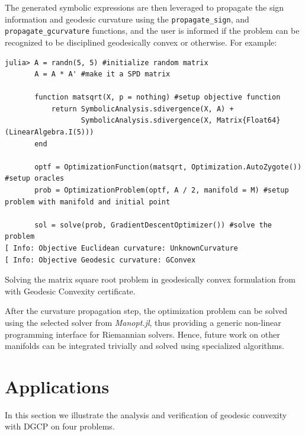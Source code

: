 \documentclass[twoside,11pt]{article}
\begin{document}
The generated symbolic expressions are then leveraged to propagate the sign information and geodesic curvature using the \texttt{propagate\_sign}, and \texttt{propagate\_gcurvature} functions, and the user is informed if the problem can be recognized to be disciplined geodesically convex or otherwise. For example:

\begin{listing}[hbt!]
\begin{verbatim}
julia> A = randn(5, 5) #initialize random matrix
       A = A * A' #make it a SPD matrix

       function matsqrt(X, p = nothing) #setup objective function
           return SymbolicAnalysis.sdivergence(X, A) +
                  SymbolicAnalysis.sdivergence(X, Matrix{Float64}(LinearAlgebra.I(5)))
       end

       optf = OptimizationFunction(matsqrt, Optimization.AutoZygote()) #setup oracles
       prob = OptimizationProblem(optf, A / 2, manifold = M) #setup problem with manifold and initial point

       sol = solve(prob, GradientDescentOptimizer()) #solve the problem
[ Info: Objective Euclidean curvature: UnknownCurvature
[ Info: Objective Geodesic curvature: GConvex
\end{verbatim}
\caption{Solving the matrix square root problem in geodesically convex formulation from \citep{sra2015matrix} with Geodesic Convexity certificate.}
\end{listing}\label{listing:verificationproblem}



After the curvature propagation step, the optimization problem can be solved using the selected solver from \textsl{Manopt.jl}, thus providing a generic non-linear programming interface for Riemannian solvers. Hence, future work on other manifolds can be integrated trivially and solved using specialized algorithms.


\section{Applications}
In this section we illustrate the analysis and verification of geodesic convexity with DGCP on four problems.
\end{document}
